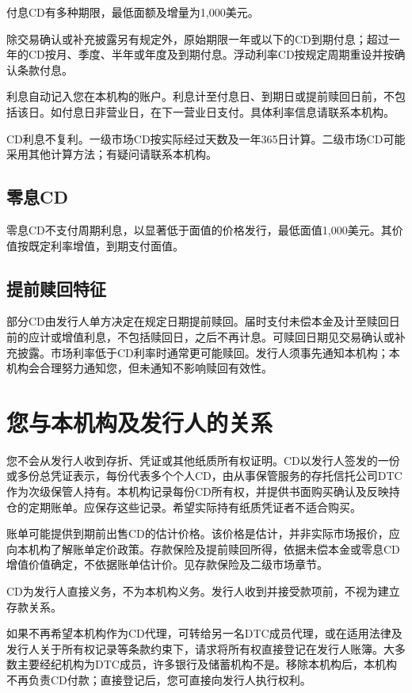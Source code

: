 \documentclass[UTF8,fontset=none,11pt,a4paper]{ctexart}
\begin{document}
付息CD有多种期限，最低面额及增量为1,000美元。


除交易确认或补充披露另有规定外，原始期限一年或以下的CD到期付息；超过一年的CD按月、季度、半年或年度及到期付息。浮动利率CD按规定周期重设并按确认\allowbreak\mbox{条款付息。}


利息自动记入您在本机构的账户。利息计至付息日、到期日或提前赎回日前，不包括该日。如付息日非营业日，在下一营业日支付。具体利率信息请联\allowbreak\mbox{系本机构。}


CD利息不复利。一级市场CD按实际经过天数及一年365日计算。二级市场CD可能采用其他计算方法；有疑问请联\allowbreak\mbox{系本机构。}


\subsection*{零息CD}
零息CD不支付周期利息，以显著低于面值的价格发行，最低面值1,000美元。其价值按既定利率增值，到期\allowbreak\mbox{支付面值。}


\subsection*{提前赎回特征}
部分CD由发行人单方决定在规定日期提前赎回。届时支付未偿本金及计至赎回日前的应计或增值利息，不包括赎回日，之后不再计息。可赎回日期见交易确认或补充披露。市场利率低于CD利率时通常更可能赎回。发行人须事先通知本机构；本机构会合理努力通知您，但未通知不影响赎\allowbreak\mbox{回有效性。}


\section*{您与本机构及发行人的关系}
您不会从发行人收到存折、凭证或其他纸质所有权证明。CD以发行人签发的一份或多份总凭证表示，每份代表多个个人CD，由从事保管服务的存托信托公司DTC作为次级保管人持有。本机构记录每份CD所有权，并提供书面购买确认及反映持仓的定期账单。应保存这些记录。希望实际持有纸质凭证者不\allowbreak\mbox{适合购买。}


账单可能提供到期前出售CD的估计价格。该价格是估计，并非实际市场报价，应向本机构了解账单定价政策。存款保险及提前赎回所得，依据未偿本金或零息CD增值价值确定，不依据账单估计价。见存款保险及二级\allowbreak\mbox{市场章节。}


CD为发行人直接义务，不为本机构义务。发行人收到并接受款项前，不视为建立\allowbreak\mbox{存款关系。}


如果不再希望本机构作为CD代理，可转给另一名DTC成员代理，或在适用法律及发行人关于所有权记录等条款约束下，请求将所有权直接登记在发行人账簿。大多数主要经纪机构为DTC成员，许多银行及储蓄机构不是。移除本机构后，本机构不再负责CD付款；直接登记后，您可直接向发行人\allowbreak\mbox{执行权利。}
\end{document}
